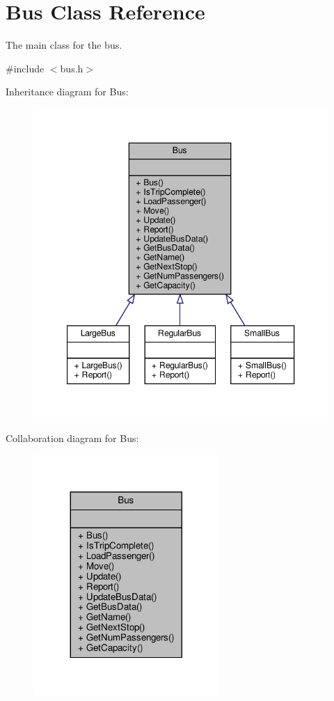 \hypertarget{classBus}{}\section{Bus Class Reference}
\label{classBus}


The main class for the bus.  




{\ttfamily \#include $<$bus.\+h$>$}



Inheritance diagram for Bus\+:\nopagebreak
\begin{figure}[H]
\begin{center}
\leavevmode
\includegraphics[width=347pt]{classBus__inherit__graph}
\end{center}
\end{figure}


Collaboration diagram for Bus\+:\nopagebreak
\begin{figure}[H]
\begin{center}
\leavevmode
\includegraphics[width=200pt]{classBus__coll__graph}
\end{center}
\end{figure}
